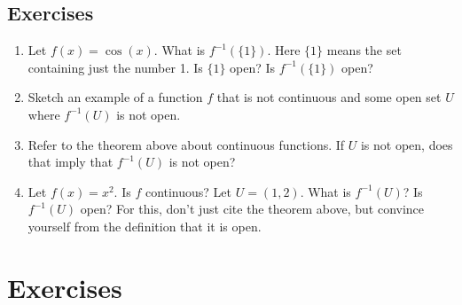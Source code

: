 \documentclass[11pt]{book}
\numberwithin{example}{chapter}
\begin{document}
\subsection{Exercises}

\begin{enumerate}
\item
Let $f(x)=\cos(x)$.  What is $f^{-1}(\{1\})$.  Here $\{1\}$ means the set containing just the number 1. Is $\{1\}$ open?  Is $f^{-1}(\{1\})$ open?




\item
Sketch an example of a function $f$ that is not continuous and some open set $U$ where $f^{-1}(U)$ is not open.  

\item
Refer to the theorem above about continuous functions.  If $U$ is not open, does that imply that $f^{-1}(U)$ is not open?

\item
Let $f(x)=x^2$.  Is $f$ continuous?  Let $U=(1,2)$. What is $f^{-1}(U)$?  Is $f^{-1}(U)$ open?  For this, don't just cite the theorem above, but convince yourself from the definition that it is open.



\end{enumerate}



\section{Exercises}
\end{document}
